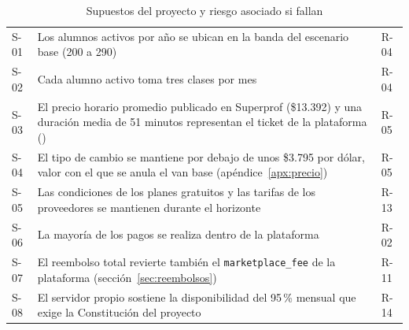 \begin{table}[H]
    \centering
    \caption{Supuestos del proyecto y riesgo asociado si fallan}
    \label{tab:supuestos}
    \small
    \begin{tabularx}{\textwidth}{l L l}
        \toprule
         &  &  \\
        \midrule
        S-01 & Los alumnos activos por año se ubican en la banda del escenario base (200 a 290) & R-04 \\
        S-02 & Cada alumno activo toma tres clases por mes & R-04 \\
        S-03 & El precio horario promedio publicado en Superprof (\$13.392) y una duración media de 51 minutos representan el ticket de la plataforma () & R-05 \\
        S-04 & El tipo de cambio se mantiene por debajo de unos \$3.795 por dólar, valor con el que se anula el \gls{van} base (apéndice~\ref{apx:precio}) & R-05 \\
        S-05 & Las condiciones de los planes gratuitos y las tarifas de los proveedores se mantienen durante el horizonte & R-13 \\
        S-06 & La mayoría de los pagos se realiza dentro de la plataforma & R-02 \\
        S-07 & El reembolso total revierte también el \texttt{marketplace\_fee} de la plataforma (sección~\ref{sec:reembolsos}) & R-11 \\
        S-08 & El servidor propio sostiene la disponibilidad del 95\,\% mensual que exige la Constitución del proyecto & R-14 \\
        \bottomrule
    \end{tabularx}
\end{table}

